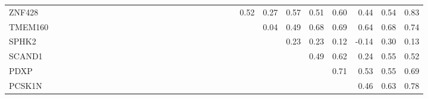 \begin{longtable}{lrrrrrrrrrrrrrrrrrrrrrrrrrrrrrr}
ZNF428    &               &            &                &               &             &              &               &               &            &             &              &               &               &              &              &             &             &            &             &               &                &              &          0.52 &        0.27 &         0.57 &       0.51 &         0.60 &           0.44 &            0.54 &          0.83 \\
TMEM160   &               &            &                &               &             &              &               &               &            &             &              &               &               &              &              &             &             &            &             &               &                &              &               &        0.04 &         0.49 &       0.68 &         0.69 &           0.64 &            0.68 &          0.74 \\
SPHK2     &               &            &                &               &             &              &               &               &            &             &              &               &               &              &              &             &             &            &             &               &                &              &               &             &         0.23 &       0.23 &         0.12 &          -0.14 &            0.30 &          0.13 \\
SCAND1    &               &            &                &               &             &              &               &               &            &             &              &               &               &              &              &             &             &            &             &               &                &              &               &             &              &       0.49 &         0.62 &           0.24 &            0.55 &          0.52 \\
PDXP      &               &            &                &               &             &              &               &               &            &             &              &               &               &              &              &             &             &            &             &               &                &              &               &             &              &            &         0.71 &           0.53 &            0.55 &          0.69 \\
PCSK1N    &               &            &                &               &             &              &               &               &            &             &              &               &               &              &              &             &             &            &             &               &                &              &               &             &              &            &              &           0.46 &            0.63 &          0.78 \\

\end{longtable}
